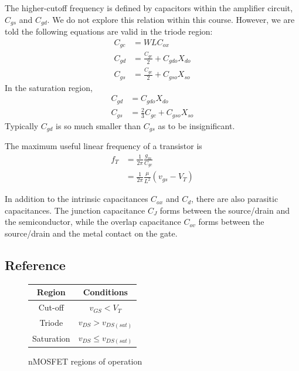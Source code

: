 \documentclass[nobib]{tufte-handout}
\begin{document}
The higher-cutoff frequency is defined by capacitors within 
the amplifier circuit, $C_{gs}$ and $C_{gd}$. 
We do not explore this relation within this course.
However, we are told the following equations are 
valid in the triode region:
\begin{align} \label{eq:35}
    C_{gc} &= WLC_{ox} \\
    C_{gd} &= \frac{C_{gc}}{2} + C_{gdo} X_{do} \\
    C_{gs} &= \frac{C_{gc}}{2} + C_{gso} X_{so}
\end{align}
In the saturation region, 
\begin{align} \label{eq:36}
    C_{gd} &= C_{gdo}X_{do} \\
    C_{gs} &= \frac{2}{3}C_{gc} + C_{gso}X_{so}
\end{align}
Typically $C_{gd}$ is so much smaller than $C_{gs}$
as to be insignificant. 

The maximum useful linear frequency of 
a transistor is
\begin{align} \label{eq:37}
    f_T &= \frac{1}{2\pi} \frac{g_m}{C_{gc}} \\
    &= \frac{1}{2\pi} \frac{\mu}{L^2} (v_{gs} - V_T)
\end{align}

In addition to the intrinsic capacitances $C_{ox}$
and $C_d$, there are also parasitic capacitances. 
The junction capacitance $C_J$ forms between the 
source/drain and the semiconductor, while the 
overlap capacitance $C_{ov}$ forms between the 
source/drain and the metal contact on the gate. 

\subsection{Reference}

\begin{figure}
    \begin{center}
        \begin{tabular}{ c | c }
            Region & Conditions \\
            \hline
            Cut-off & $v_{GS} < V_T$ \\
            Triode & $v_{DS} > v_{DS(sat)}$\\
            Saturation & $v_{DS} \leq v_{DS(sat)}$\\
            \hline
        \end{tabular}
    \end{center}
    \caption{nMOSFET regions of operation}
    \label{tab:nMOSFET regions}
\end{figure}
\end{document}
